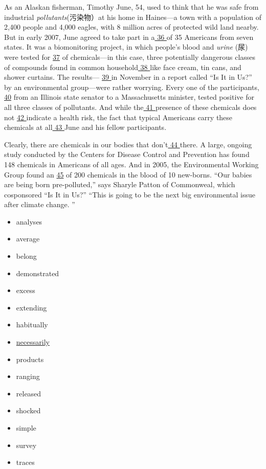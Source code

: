 \documentclass[UTF8,11pt]{ctexart}
\begin{document}
As an Alaskan fisherman, Timothy June, 54, used to think that he was safe from industrial\textit{ pollutants}(污染物）at his home in Haines—a town with a population of 2,400 people and 4,000 eagles, with 8 million acres of protected wild land nearby. But in early 2007, June agreed to take part in a\uline{ 36 }of 35 Americans from seven states. It was a biomonitoring project, in which people’s blood and\textit{ urine} (尿) were tested for \uline{37} of chemicals—in this case, three potentially dangerous classes of compounds found in common household\uline{ 38 }like face cream, tin cans, and shower curtains. The results— \uline{39 }in November in a report called “Is It in Us?” by an environmental group—were rather worrying. Every one of the participants, \uline{40} from an Illinois state senator to a Massachusetts minister, tested positive for all three classes of pollutants. And while the\uline{ 41 }presence of these chemicals does not \uline{42 }indicate a health risk, the fact that typical Americans carry these chemicals at all\uline{ 43 }June and his fellow participants.


Clearly, there are chemicals in our bodies that don’t\uline{ 44 }there. A large, ongoing study conducted by the Centers for Disease Control and Prevention has found 148 chemicals in Americans of all ages. And in 2005, the Environmental Working Group found an \uline{45} of 200 chemicals in the blood of 10 new-borns. “Our babies are being born pre-polluted,” says Sharyle Patton of Commonweal, which cosponsored “Is It in Us?” “This is going to be the next big environmental issue after climate change. ”


\begin{itemize}[leftmargin=2em,itemsep=.2em,topsep=.4em]\item[A.] analyses
\item[B.] average
\item[C.] belong
\item[D.] demonstrated
\item[E.] excess
\item[F.] extending
\item[G.] habitually
\item[H.] \uline{necessarily}
\item[I.] products
\item[J.] ranging
\item[K.] released
\item[L.] shocked
\item[M.] simple
\item[N.] survey
\item[O.] traces
\end{itemize}
\end{document}

